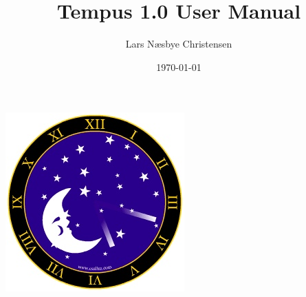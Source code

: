 \documentclass[11pt]{article}
\begin{document}
\begin{titlepage}
\begin{center}
\includegraphics[scale=0.5]{../resources/moonStarsClock.jpg}
\end{center}
\title{Tempus 1.0 User Manual}

\author{Lars N{\ae}sbye Christensen}
\date{\today}
\end{titlepage}
\maketitle
\pagebreak

\tableofcontents
\pagebreak


\pagebreak


\pagebreak


\pagebreak


\pagebreak


\pagebreak


\pagebreak


\end{document}
